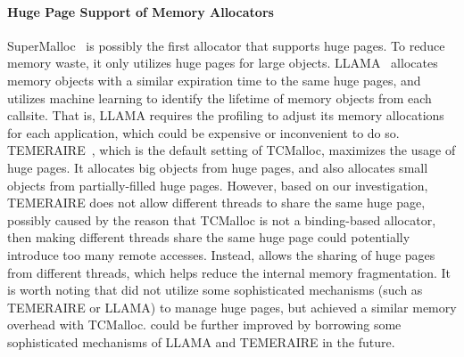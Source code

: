 \paragraph{Huge Page Support of Memory Allocators}
SuperMalloc~\cite{supermalloc} is possibly the first allocator that supports huge pages. To reduce memory waste, it only utilizes huge pages for large objects. LLAMA~\cite{LLAMA} allocates memory objects with a similar expiration time to the same huge pages, and utilizes machine learning to identify the lifetime of memory objects from each callsite. That is, LLAMA requires the profiling to adjust its memory allocations for each application, which could be expensive or inconvenient to do so. TEMERAIRE~\cite{TEMERAIRE}, which is the default setting of TCMalloc, maximizes the usage of huge pages. It allocates big objects from huge pages, and also allocates small objects from partially-filled huge pages. However, based on our investigation, TEMERAIRE does not allow different threads to share the same huge page, 
possibly caused by the reason that TCMalloc is not a binding-based allocator, then making different threads share the same huge page could potentially introduce too many remote accesses.  
Instead, \NM{} allows the sharing of huge pages from different threads, 
 which helps reduce the internal memory fragmentation. It is worth noting that \NM{} did not utilize some sophisticated mechanisms (such as TEMERAIRE or LLAMA) to manage huge pages, but achieved a similar memory overhead with TCMalloc. 
\NM{} could be further improved by borrowing some sophisticated mechanisms of LLAMA and TEMERAIRE in the future. 



